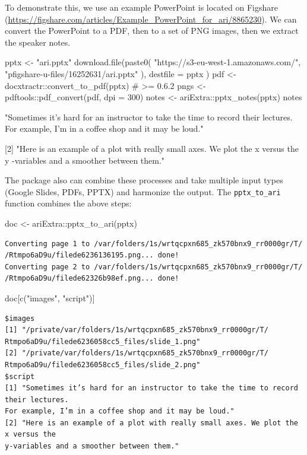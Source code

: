 To demonstrate this, we use an example PowerPoint is located on Figshare
(\url{https://figshare.com/articles/Example_PowerPoint_for_ari/8865230}).
We can convert the PowerPoint to a PDF, then to a set of PNG images,
then we extract the speaker notes.

\begin{example}
pptx <- "ari.pptx"
download.file(paste0(
  "https://s3-eu-west-1.amazonaws.com/",
  "pfigshare-u-files/16252631/ari.pptx"
),
destfile = pptx
)
pdf <- docxtractr::convert_to_pdf(pptx) # >= 0.6.2
pngs <- pdftools::pdf_convert(pdf, dpi = 300)
notes <- ariExtra::pptx_notes(pptx)
notes
\end{example}

\begin{example}
[1] "Sometimes it’s hard for an instructor to take the time to record their lectures.
For example, I’m in a coffee shop and it may be loud."

[2] "Here is an example of a plot with really small axes.  We plot the x versus the y
-variables and a smoother between them."
\end{example}

The  package also can combine these processes and take
multiple input types (Google Slides, PDFs, PPTX) and harmonize the
output. The \texttt{pptx\_to\_ari} function combines the above steps:

\begin{example}
doc <- ariExtra::pptx_to_ari(pptx)
\end{example}

\begin{verbatim}
Converting page 1 to /var/folders/1s/wrtqcpxn685_zk570bnx9_rr0000gr/T/
/Rtmpo6aD9u/filede6236136195.png... done!
Converting page 2 to /var/folders/1s/wrtqcpxn685_zk570bnx9_rr0000gr/T/
/Rtmpo6aD9u/filede62326b98ef.png... done!
\end{verbatim}

\begin{example}
doc[c("images", "script")]
\end{example}

\begin{verbatim}
$images
[1] "/private/var/folders/1s/wrtqcpxn685_zk570bnx9_rr0000gr/T/
Rtmpo6aD9u/filede6236058cc5_files/slide_1.png"
[2] "/private/var/folders/1s/wrtqcpxn685_zk570bnx9_rr0000gr/T/
Rtmpo6aD9u/filede6236058cc5_files/slide_2.png"
$script
[1] "Sometimes it’s hard for an instructor to take the time to record their lectures. 
For example, I’m in a coffee shop and it may be loud."
[2] "Here is an example of a plot with really small axes. We plot the x versus the 
y-variables and a smoother between them."
\end{verbatim}

